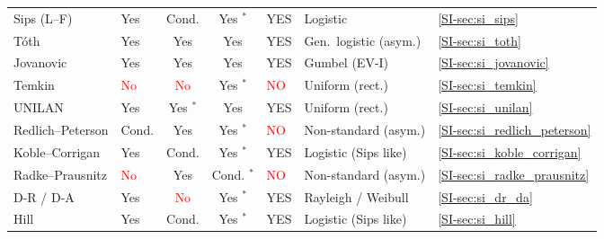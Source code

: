 \documentclass[journal=jacsat,manuscript=article]{achemso}
\begin{document}
\begin{table}[H]
\begin{tabular}{@{} p{2.0cm} p{1.0cm} c c p{3.0cm} p{3.8cm} p{1.8cm} @{}}
			Sips (L--F)
			& \textcolor{green!50!black}{Yes} & \textcolor{orange!80!black}{Cond.} & \textcolor{green!50!black}{Yes} $^*$
			& \textcolor{green!50!black}{YES}
			& Logistic
			& \ref{SI-sec:si_sips} \\
			T\'{o}th
			& \textcolor{green!50!black}{Yes} & \textcolor{green!50!black}{Yes} & \textcolor{green!50!black}{Yes}
			& \textcolor{green!50!black}{YES}
			& Gen.\ logistic (asym.)
			& \ref{SI-sec:si_toth} \\
			Jovanovic
			& \textcolor{green!50!black}{Yes} & \textcolor{green!50!black}{Yes} & \textcolor{green!50!black}{Yes}
			& \textcolor{green!50!black}{YES}
			& Gumbel (EV-I)
			& \ref{SI-sec:si_jovanovic} \\
			Temkin
			& \textcolor{red}{No} & \textcolor{red}{No} & \textcolor{green!50!black}{Yes} $^*$
			& \textcolor{red}{NO}
			& Uniform (rect.)
			& \ref{SI-sec:si_temkin} \\
			UNILAN
			& \textcolor{green!50!black}{Yes} & \textcolor{green!50!black}{Yes} $^*$ & \textcolor{green!50!black}{Yes}
			& \textcolor{green!50!black}{YES}
			& Uniform (rect.)
			& \ref{SI-sec:si_unilan} \\
			Redlich--Peterson
			& \textcolor{orange!80!black}{Cond.} & \textcolor{green!50!black}{Yes} & \textcolor{green!50!black}{Yes} $^*$
			& \textcolor{red}{NO}
			& Non-standard (asym.)
			& \ref{SI-sec:si_redlich_peterson} \\
			Koble--Corrigan
			& \textcolor{green!50!black}{Yes} & \textcolor{orange!80!black}{Cond.} & \textcolor{green!50!black}{Yes} $^*$
			& \textcolor{green!50!black}{YES}
			& Logistic (Sips  like)
			& \ref{SI-sec:si_koble_corrigan} \\
			Radke--Prausnitz
			& \textcolor{red}{No} & \textcolor{green!50!black}{Yes} & \textcolor{orange!80!black}{Cond.} $^*$
			& \textcolor{red}{NO}
			& Non-standard (asym.)
			& \ref{SI-sec:si_radke_prausnitz} \\
			D-R / D-A
			& \textcolor{green!50!black}{Yes} & \textcolor{red}{No} & \textcolor{green!50!black}{Yes} $^*$
			& \textcolor{green!50!black}{YES}
			& Rayleigh / Weibull
			& \ref{SI-sec:si_dr_da} \\
			Hill
			& \textcolor{green!50!black}{Yes} & \textcolor{orange!80!black}{Cond.} & \textcolor{green!50!black}{Yes} $^*$
			& \textcolor{green!50!black}{YES}
			& Logistic (Sips like)
			& \ref{SI-sec:si_hill} \\
			\hline
		\end{tabular}
	\end{table}
\end{document}
